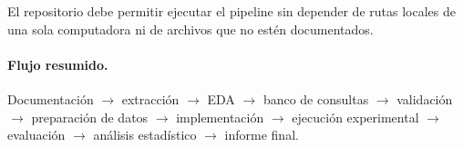 \documentclass[11pt,a4paper]{article}
\begin{document}
El repositorio debe permitir ejecutar el pipeline sin depender de rutas locales de una sola computadora ni de archivos que no estén documentados.

\paragraph{Flujo resumido.}
Documentación $\to$ extracción $\to$ EDA $\to$ banco de consultas $\to$ validación $\to$ preparación de datos $\to$ implementación $\to$ ejecución experimental $\to$ evaluación $\to$ análisis estadístico $\to$ informe final.
\end{document}
